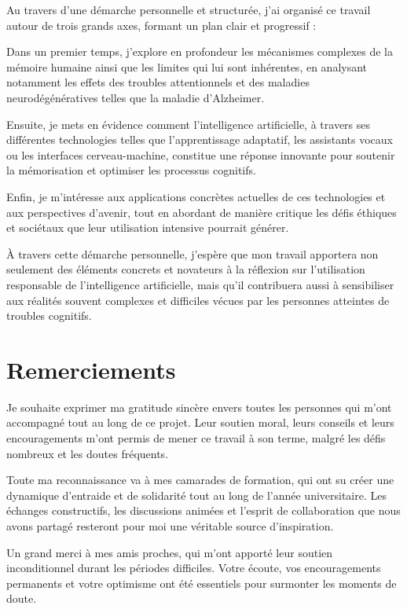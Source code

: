 \documentclass[12pt,a4paper]{report}
\begin{document}
\newpage
Au travers d’une démarche personnelle et structurée, j’ai organisé ce travail autour de trois grands axes, formant un plan clair et progressif :

Dans un premier temps, j’explore en profondeur les mécanismes complexes de la mémoire humaine ainsi que les limites qui lui sont inhérentes, en analysant notamment les effets des troubles attentionnels et des maladies neurodégénératives telles que la maladie d’Alzheimer.

Ensuite, je mets en évidence comment l’intelligence artificielle, à travers ses différentes technologies telles que l’apprentissage adaptatif, les assistants vocaux ou les interfaces cerveau-machine, constitue une réponse innovante pour soutenir la mémorisation et optimiser les processus cognitifs.

Enfin, je m’intéresse aux applications concrètes actuelles de ces technologies et aux perspectives d’avenir, tout en abordant de manière critique les défis éthiques et sociétaux que leur utilisation intensive pourrait générer.

À travers cette démarche personnelle, j’espère que mon travail apportera non seulement des éléments concrets et novateurs à la réflexion sur l’utilisation responsable de l’intelligence artificielle, mais qu’il contribuera aussi à sensibiliser aux réalités souvent complexes et difficiles vécues par les personnes atteintes de troubles cognitifs.


\chapter*{Remerciements}

Je souhaite exprimer ma gratitude sincère envers toutes les personnes qui m’ont accompagné tout au long de ce projet. Leur soutien moral, leurs conseils et leurs encouragements m’ont permis de mener ce travail à son terme, malgré les défis nombreux et les doutes fréquents.

Toute ma reconnaissance va à mes camarades de formation, qui ont su créer une dynamique d’entraide et de solidarité tout au long de l'année universitaire. Les échanges constructifs, les discussions animées et l’esprit de collaboration que nous avons partagé resteront pour moi une véritable source d’inspiration.

Un grand merci à mes amis proches, qui m’ont apporté leur soutien inconditionnel durant les périodes difficiles. Votre écoute, vos encouragements permanents et votre optimisme ont été essentiels pour surmonter les moments de doute.
\end{document}
